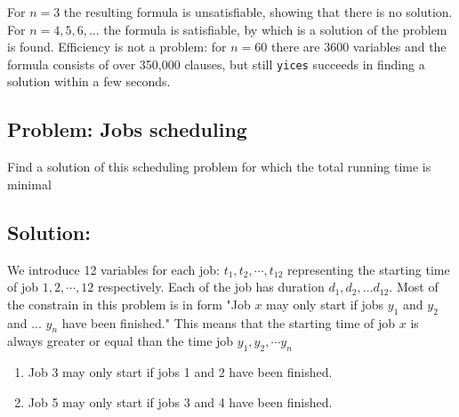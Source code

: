 \documentclass[12pt]{article}
\begin{document}
For $n=3$ the resulting formula is unsatisfiable, showing that
there is no solution. For $n = 4,5,6,\ldots$ the formula is
satisfiable, by which is a solution of the problem is found.
Efficiency is not a problem: for $n = 60$ there are 3600
variables and the formula consists of over 350,000 clauses, but 
still {\tt yices} succeeds in finding a solution within a few
seconds.



\subsection*{Problem: Jobs scheduling}
Find a solution of this scheduling problem for which the total running time is minimal

\subsection*{Solution:}
We introduce 12 variables for each job: $t_1, t_2, \cdots , t_{12}$ representing the starting time of job $1, 2, \cdots, 12$ respectively. Each of the job has duration $d_1, d_2, ... d_{12}$. Most of the constrain in this problem is in form "Job $x$ may only start if jobs $y_1$ and $y_2$ and ... $y_n$ have been finished." This means that the starting time of job $x$ is always greater or equal than the time job $y_1, y_2, \cdots y_n$  

\begin{enumerate}
	\item Job 3 may only start if jobs 1 and 2 have been finished.
	\item Job 5 may only start if jobs 3 and 4 have been finished.
	
\end{enumerate}
\end{document}
